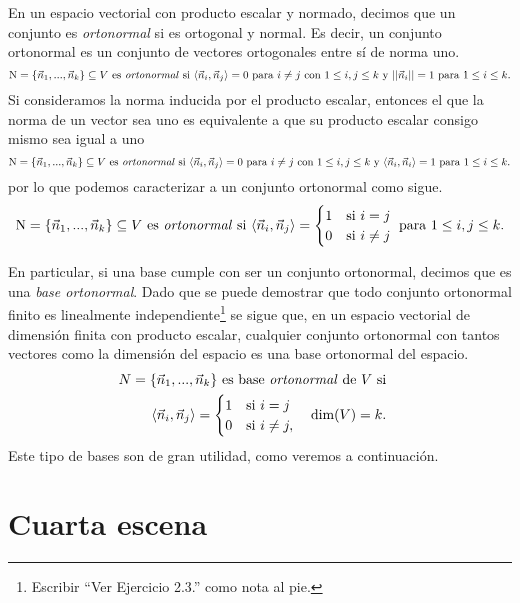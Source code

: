 \documentclass[12pt,dvipsnames]{article}
\numberwithin{equation}{section}
\begin{document}
En un espacio vectorial con producto escalar y normado, decimos que un conjunto es \emph{ortonormal} si es ortogonal y normal. Es decir, un conjunto ortonormal es un conjunto de vectores ortogonales entre sí de norma uno.
\[
    \text{N}=\{\vec{n}_1,...,\vec{n}_k\}\subseteq V \ \text{es \emph{ortonormal} si} \ \langle \vec{n}_i , \vec{n}_j \rangle = 0 \text{ para } i\neq j \text{ con } 1\le i,j\le k \text{ y } ||\vec{n}_i||=1 \text{ para } 1\le i\le k.
\]
Si consideramos la norma inducida por el producto escalar, entonces el que la norma de un vector sea uno es equivalente a que su producto escalar consigo mismo sea igual a uno
\[
    \text{N}=\{\vec{n}_1,...,\vec{n}_k\}\subseteq V \ \text{es \emph{ortonormal} si} \ \langle \vec{n}_i , \vec{n}_j \rangle = 0 \text{ para } i\neq j \text{ con } 1\le i,j\le k \text{ y } \langle \vec{n}_i , \vec{n}_i \rangle=1 \text{ para } 1\le i\le k.
\]
por lo que podemos caracterizar a un conjunto ortonormal como sigue.
\[
    \text{N}=\{\vec{n}_1,...,\vec{n}_k\}\subseteq V \ \text{es \emph{ortonormal} si} \ \langle \vec{n}_i , \vec{n}_j \rangle = \begin{cases} 1 &\text{si } i=j \\ 0 &\text{si } i\neq j \end{cases} \text{ para } 1\le i,j\le k.
\]

En particular, si una base cumple con ser un conjunto ortonormal, decimos que es una \emph{base ortonormal}. Dado que se puede demostrar que todo conjunto ortonormal finito es linealmente independiente\footnote{Escribir ``Ver Ejercicio 2.3.'' como nota al pie.} se sigue que, en un espacio vectorial de dimensión finita con producto escalar, cualquier conjunto ortonormal con tantos vectores como la dimensión del espacio es una base ortonormal del espacio. 
\begin{align*}
    N=\{\vec{n}_1,...,\vec{n}_k\} \text{ es base \emph{ortonormal} de } V \text{ si}& & &\\
    \langle \vec{n}_i , \vec{n}_j \rangle = \begin{cases} 1 &\text{si } i=j \\ 0 &\text{si } i\neq j, \end{cases} \quad \text{dim}(V)=k.
\end{align*}
Este tipo de bases son de gran utilidad, como veremos a continuación.


\newpage
\section{Cuarta escena}
\end{document}
